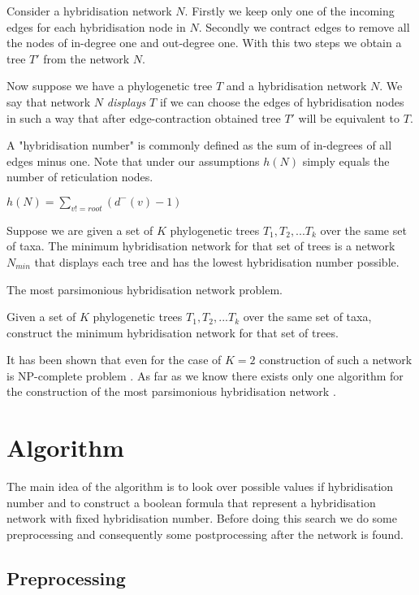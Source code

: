 \documentclass[runningheads, envcountsame, a4paper]{llncs}
\begin{document}
Consider a hybridisation network $N$. Firstly we keep only one of the incoming edges for each hybridisation node in $N$. Secondly we contract edges to remove all the nodes of in-degree one and out-degree one. With this two steps we obtain a tree $T'$ from the network $N$.

Now suppose we have a phylogenetic tree $T$ and a hybridisation network $N$. We say that network $N$ \emph{displays} $T$ if we can choose the edges of hybridisation nodes in such a way that after edge-contraction obtained tree $T'$ will be equivalent to $T$.

A "hybridisation number" is commonly defined as the sum of in-degrees of all edges minus one. Note that under our assumptions $h(N)$ simply equals the number of reticulation nodes.

$h(N) = \sum\limits_{v != root} (d^-(v) - 1)$

Suppose we are given a set of $K$ phylogenetic trees $T_1, T_2, ... T_k$ over the same set of taxa. The minimum hybridisation network for that set of trees is a network $N_{min}$ that displays each tree and has the lowest hybridisation number possible.

The most parsimonious hybridisation network problem.

Given a set of $K$ phylogenetic trees $T_1, T_2, ... T_k$ over the same set of taxa, construct the minimum hybridisation network for that set of trees.

It has been shown that even for the case of $K=2$ construction of such a network is NP-complete problem \cite {bordewich2007computing}. As far as we know there exists only one algorithm for the construction of the most parsimonious hybridisation network \cite {wu2013algorithm}.


\section{Algorithm}

The main idea of the algorithm is to look over possible values if hybridisation number and to construct a boolean formula that represent a hybridisation network with fixed hybridisation number. Before doing this search we do some preprocessing and consequently some postprocessing after the network is found.


\subsection{Preprocessing}
\end{document}
